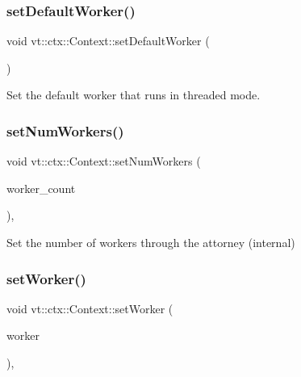\mbox{\label{structvt_1_1ctx_1_1_context_ab61a961c47c8fc6393df8c121ade3aa2}} 
\subsubsection{\texorpdfstring{set\+Default\+Worker()}{setDefaultWorker()}}
{\footnotesize\ttfamily void vt\+::ctx\+::\+Context\+::set\+Default\+Worker (\begin{DoxyParamCaption}{ }\end{DoxyParamCaption})\hspace{0.3cm}{\ttfamily [private]}}



Set the default worker that runs in threaded mode. 

\mbox{\label{structvt_1_1ctx_1_1_context_afc4549ac9cdae67301613613b9381d1c}} 
\subsubsection{\texorpdfstring{set\+Num\+Workers()}{setNumWorkers()}}
{\footnotesize\ttfamily void vt\+::ctx\+::\+Context\+::set\+Num\+Workers (\begin{DoxyParamCaption}\item[{\hyperlink{namespacevt_aa93398ea48f2cb6c188512250f7cc248}{Worker\+Count\+Type} const}]{worker\+\_\+count }\end{DoxyParamCaption})\hspace{0.3cm}{\ttfamily [inline]}, {\ttfamily [protected]}}



Set the number of workers through the attorney (internal) 

\mbox{\label{structvt_1_1ctx_1_1_context_a32f62f26b7a6977c91186f8c2aa2b16a}} 
\subsubsection{\texorpdfstring{set\+Worker()}{setWorker()}}
{\footnotesize\ttfamily void vt\+::ctx\+::\+Context\+::set\+Worker (\begin{DoxyParamCaption}\item[{\hyperlink{namespacevt_a656e362091da17b9b93d0655b36e3392}{Worker\+I\+D\+Type} const}]{worker }\end{DoxyParamCaption})\hspace{0.3cm}{\ttfamily [inline]}, {\ttfamily [protected]}}



